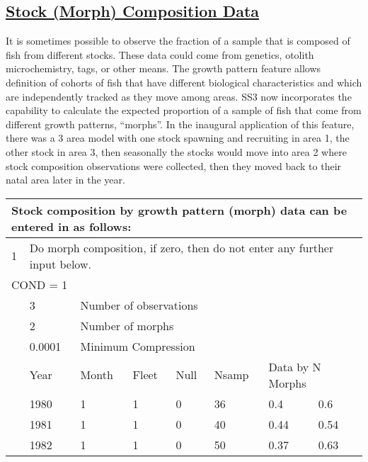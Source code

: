 \hypertarget{StockComp}{}
\subsection[Stock (Morph) Composition Data]{\protect\hyperlink{StockComp}{Stock (Morph) Composition Data}}
It is sometimes possible to observe the fraction of a sample that is composed of fish from different stocks. These data could come from genetics, otolith microchemistry, tags, or other means. The growth pattern feature allows definition of cohorts of fish that have different biological characteristics and which are independently tracked as they move among areas. SS3 now incorporates the capability to calculate the expected proportion of a sample of fish that come from different growth patterns, ``morphs''. In the inaugural application of this feature, there was a 3 area model with one stock spawning and recruiting in area 1, the other stock in area 3, then seasonally the stocks would move into area 2 where stock composition observations were collected, then they moved back to their natal area later in the year.

\begin{center}
	\begin{tabular}{p{1.1cm} p{1.1cm} p{1.1cm} p{1.1cm} p{1.1cm} p{1.1cm} p{1.1cm} p{3.5cm}}
		\multicolumn{8}{l}{Stock composition by growth pattern (morph) data can be entered in as follows:} \\
		\hline
		1 &  \multicolumn{7}{l}{Do morph composition, if zero, then do not enter any further input below.} \Tstrut\Bstrut\\
		\hline
		\multicolumn{8}{l}{COND = 1} \Tstrut\\ 
		& 3 & \multicolumn{6}{l}{Number of observations} \Bstrut\\
		\hline
		& 2 & \multicolumn{6}{l}{Number of morphs} \Tstrut\Bstrut\\
		\hline
		& 0.0001 & \multicolumn{6}{l}{Minimum Compression} \Tstrut\Bstrut\\
		\hline
		& Year & Month & Fleet & Null & Nsamp & \multicolumn{2}{l}{Data by N Morphs} \Tstrut\Bstrut\\
		\hline
		& 1980 & 1 & 1 & 0 & 36 & 0.4 & 0.6 \Tstrut\\
		& 1981 & 1 & 1 & 0 & 40 & 0.44 & 0.54 \\
		& 1982 & 1 & 1 & 0 & 50 & 0.37 & 0.63 \Bstrut\\
		\hline
	\end{tabular}
	\leavevmode\tagmcend\tagstructend\par
\end{center}

